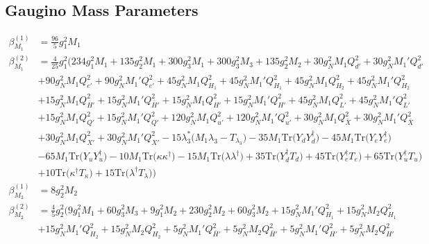 \subsection{Gaugino Mass Parameters}
{\allowdisplaybreaks  \begin{align} 
\beta_{M_1}^{(1)} & =  
\frac{96}{5} g_{1}^{2} M_1 \\ 
\beta_{M_1}^{(2)} & =  
\frac{4}{25} g_{1}^{2} \Big(234 g_{1}^{2} M_1 +135 g_{2}^{2} M_1 +300 g_{3}^{2} M_1 +300 g_{3}^{2} M_3 +135 g_{2}^{2} M_2 +30 g_{N}^{2} M_1 Q_{d'}^{2} +30 g_{N}^{2} M_1' Q_{d'}^{2} \nonumber \\ 
 &+90 g_{N}^{2} M_1 Q_{e'}^{2} +90 g_{N}^{2} M_1' Q_{e'}^{2} +45 g_{N}^{2} M_1 Q_{H_1}^{2} +45 g_{N}^{2} M_1' Q_{H_1}^{2} +45 g_{N}^{2} M_1 Q_{H_2}^{2} +45 g_{N}^{2} M_1' Q_{H_2}^{2} \nonumber \\ 
 &+15 g_{N}^{2} M_1 Q_{\bar{H}'}^{2} +15 g_{N}^{2} M_1' Q_{\bar{H}'}^{2} +15 g_{N}^{2} M_1 Q_{H'}^{2} +15 g_{N}^{2} M_1' Q_{H'}^{2} +45 g_{N}^{2} M_1 Q_{L'}^{2} +45 g_{N}^{2} M_1' Q_{L'}^{2} \nonumber \\ 
 &+15 g_{N}^{2} M_1 Q_{Q'}^{2} +15 g_{N}^{2} M_1' Q_{Q'}^{2} +120 g_{N}^{2} M_1 Q_{u'}^{2} +120 g_{N}^{2} M_1' Q_{u'}^{2} +30 g_{N}^{2} M_1 Q_{\bar{X}}^{2} +30 g_{N}^{2} M_1' Q_{\bar{X}}^{2} \nonumber \\ 
 &+30 g_{N}^{2} M_1 Q_{X'}^{2} +30 g_{N}^{2} M_1' Q_{X'}^{2} -15 \lambda_3^* \Big(M_1 \lambda_3  - T_{\lambda_3} \Big)-35 M_1 \mbox{Tr}\Big({Y_d  Y_{d}^{\dagger}}\Big) -45 M_1 \mbox{Tr}\Big({Y_e  Y_{e}^{\dagger}}\Big) \nonumber \\ 
 &-65 M_1 \mbox{Tr}\Big({Y_u  Y_{u}^{\dagger}}\Big) -10 M_1 \mbox{Tr}\Big({\kappa  \kappa^{\dagger}}\Big) -15 M_1 \mbox{Tr}\Big({\lambda  \lambda^{\dagger}}\Big) +35 \mbox{Tr}\Big({Y_{d}^{\dagger}  T_d}\Big) +45 \mbox{Tr}\Big({Y_{e}^{\dagger}  T_e}\Big) +65 \mbox{Tr}\Big({Y_{u}^{\dagger}  T_u}\Big) \nonumber \\ 
 &+10 \mbox{Tr}\Big({\kappa^{\dagger}  T_{\kappa}}\Big) +15 \mbox{Tr}\Big({\lambda^{\dagger}  T_{\lambda}}\Big) \Big)\\ 
\beta_{M_2}^{(1)} & =  
8 g_{2}^{2} M_2 \\ 
\beta_{M_2}^{(2)} & =  
\frac{4}{5} g_{2}^{2} \Big(9 g_{1}^{2} M_1 +60 g_{3}^{2} M_3 +9 g_{1}^{2} M_2 +230 g_{2}^{2} M_2 +60 g_{3}^{2} M_2 +15 g_{N}^{2} M_1' Q_{H_1}^{2} +15 g_{N}^{2} M_2 Q_{H_1}^{2} \nonumber \\ 
 &+15 g_{N}^{2} M_1' Q_{H_2}^{2} +15 g_{N}^{2} M_2 Q_{H_2}^{2} +5 g_{N}^{2} M_1' Q_{\bar{H}'}^{2} +5 g_{N}^{2} M_2 Q_{\bar{H}'}^{2} +5 g_{N}^{2} M_1' Q_{H'}^{2} +5 g_{N}^{2} M_2 Q_{H'}^{2} \nonumber \\ 

\end{align}}
